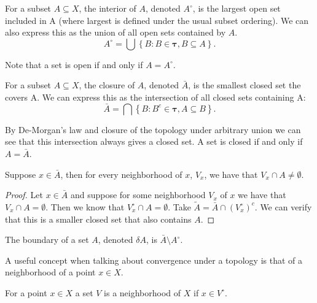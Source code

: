 \begin{definition}[Interior]
	\label{def:interior}
	For a subset \(A \subseteq X\), the interior of  \(A\), denoted \(A^\circ\), is the largest open set included in A (where largest is defined under the usual subset ordering). We can also express this as the union of all open sets contained by \(A\).
	 \[
		 A^\circ = \bigcup\left\{B: B \in \boldsymbol{\tau}, B \subseteq A\right\}
	.\] 
\end{definition}
Note that a set is open if and only if \(A = A^\circ\).

\begin{definition}[Closure]
	\label{def:closure}
	For a subset \(A \subseteq X\), the closure of  \(A\), denoted  \(\bar{A}\), is the smallest closed set the covers A. We can express this as the intersection of all closed sets containing A:
	 \[
		 \bar{A} = \bigcap \left\{B: B^c \in \boldsymbol{\tau}, A \subseteq B\right\}
	.\] 
\end{definition}
By De-Morgan's law and closure of the topology under arbitrary union we can see that this intersection always gives a closed set. A set is closed if and only if \(A = \bar{A}\).

\begin{lemma}[]
	\label{lemma:prelim}
	Suppose \(x \in \bar{A}\), then for every neighborhood of  \(x\),  \(V_x\), we have that  \(V_x \cap A \neq \emptyset\).
\end{lemma}
\begin{proof}
	Let \(x \in \bar{A}\) and suppose for some neighborhood  \(V_x\) of \(x\) we have that  \(V_x \cap A = \emptyset\). Then we know that  \(V_x^\circ \cap A = \emptyset\). Take  \(\tilde A = \bar A \cap (V_x^\circ)^c\). We can verify that this is a smaller closed set that also contains  \(A\).
\end{proof}


\begin{definition}[Boundary]
	\label{def:boundary}
	The boundary of a set \(A\), denoted  \(\delta A\), is  \(\bar{A}\setminus A^\circ\).
\end{definition}

A useful concept when talking about convergence under a topology is that of a neighborhood of a point \(x \in X\).

\begin{definition}[Neighborhood]
	\label{def:neighborhood}
	For a point \(x \in X\) a set  \(V\) is a neighborhood of  \(X\) if  \(x \in V^\circ\).
\end{definition}


